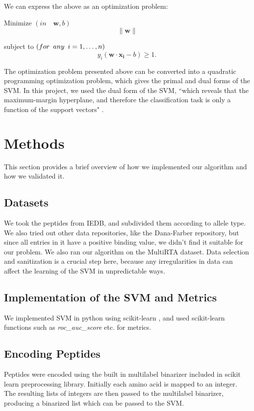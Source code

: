 \documentclass[journal]{IEEEtran}
\begin{document}
We can express the above as an optimization problem:

Minimize $(in \quad {\mathbf{w},b})$
$$   
 \|\mathbf{w}\|
$$
 
subject to $(for \enskip any \enskip i = 1, \dots, n)$
$$
y_i(\mathbf{w}\cdot\mathbf{x_i} - b) \ge 1. \,
$$

The optimization problem presented above can be converted into a quadratic programming optimization problem, which gives the primal and dual forms of the SVM. In this project, we used the dual form of the SVM, ``which reveals that the maximum-margin hyperplane, and therefore the classification task is only a function of the support vectors" \cite{WikipediaSVM}.


\section{Methods}
This section provides a brief overview of how we implemented our algorithm and how we validated it.

\subsection{Datasets}
We took the peptides from IEDB, and subdivided them according to allele type. We also tried out other data repositories, like the Dana-Farber \cite{DanaFarber} repository, but since all entries in it have a positive binding value, we didn't find it suitable for our problem. We also ran our algorithm on the MultiRTA \cite{MultiRTA} dataset. Data selection and sanitization is a crucial step here, because any irregularities in data can affect the learning of the SVM in unpredictable ways.

\subsection{Implementation of the SVM and Metrics}
We implemented SVM in python using scikit-learn \cite{ScikitLearn}, and used scikit-learn functions such as \textit{roc\_auc\_score} etc. for metrics.

\subsection{Encoding Peptides}
Peptides were encoded using the built in multilabel binarizer included in scikit learn preprocessing library.  Initially each amino acid is mapped to an integer.  The resulting lists of integers are then passed to the multilabel binarizer, producing a binarized list which can be passed to the SVM.
\end{document}
